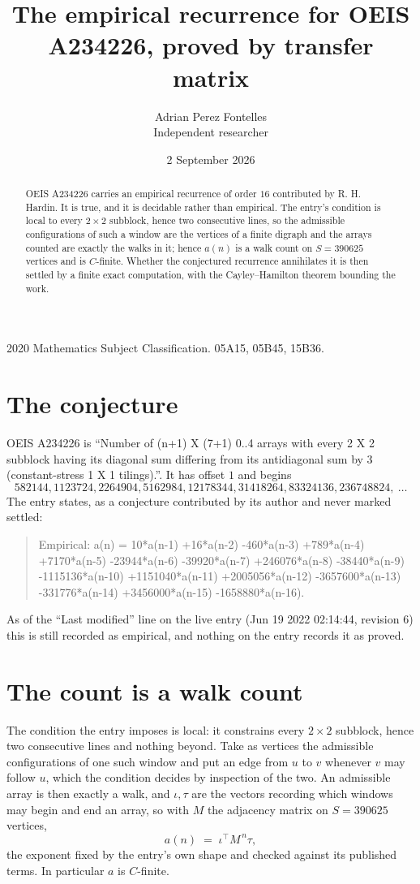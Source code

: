 \documentclass[11pt,a4paper]{article}
\title{The empirical recurrence for OEIS A234226, proved by transfer matrix}
\author{Adrian Perez Fontelles\\ \small Independent researcher}
\date{2 September 2026}
\theoremstyle{plain}
\theoremstyle{definition}
\begin{document}
\maketitle

\begin{abstract}
OEIS A234226 carries an empirical recurrence of order $16$ contributed by R. H. Hardin. It is
true, and it is decidable rather than empirical. The entry's condition is local to every $2\times2$ subblock, hence two consecutive lines, so
the admissible configurations of such a window are the vertices of a finite digraph and the
arrays counted are exactly the walks in it; hence $a(n)$ is a walk count on $S=390625$ vertices
and is $C$-finite. Whether the conjectured recurrence annihilates it is then settled by a
finite exact computation, with the Cayley--Hamilton theorem bounding the work.
\end{abstract}

\noindent\small 2020 Mathematics Subject Classification. 05A15, 05B45, 15B36.\normalsize

\section{The conjecture}

OEIS A234226 is ``Number of (n+1) X (7+1) 0..4 arrays with every 2 X 2 subblock having its diagonal sum differing from its antidiagonal sum by 3 (constant-stress 1 X 1 tilings).''. It has offset $1$ and begins
\[
582144, 1123724, 2264904, 5162984, 12178344, 31418264, 83324136, 236748824,\ \dots
\]
The entry states, as a conjecture contributed by its author and never marked settled:
\begin{quote}
Empirical: a(n) = 10*a(n-1) +16*a(n-2) -460*a(n-3) +789*a(n-4) +7170*a(n-5) -23944*a(n-6) -39920*a(n-7) +246076*a(n-8) -38440*a(n-9) -1115136*a(n-10) +1151040*a(n-11) +2005056*a(n-12) -3657600*a(n-13) -331776*a(n-14) +3456000*a(n-15) -1658880*a(n-16).
\end{quote}
As of the ``Last modified'' line on the live entry (Jun 19 2022 02:14:44, revision 6) this is still
recorded as empirical, and nothing on the entry records it as proved.

\section{The count is a walk count}

The condition the entry imposes is local: it constrains every $2\times2$ subblock, hence two consecutive lines and nothing beyond. Take as vertices the admissible configurations of one such window and put an edge from $u$ to $v$ whenever $v$ may follow $u$, which the condition decides by inspection of the two.
An admissible array is then exactly a walk, and $\iota,\tau$ are the vectors recording which windows may begin and end an array, so with $M$ the adjacency matrix on $S=390625$ vertices,
\[
a(n)\;=\;\iota^{\!\top}M^{\,n}\tau ,
\]
the exponent fixed by the entry's own shape and checked against its published terms. In
particular $a$ is $C$-finite.
\end{document}
